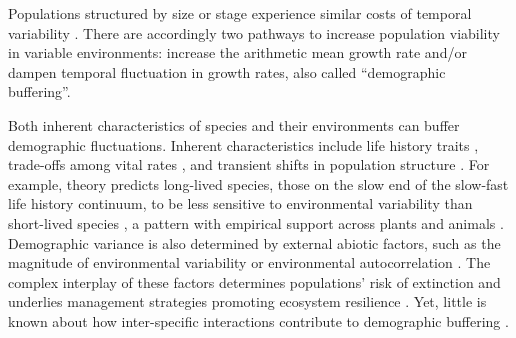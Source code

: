 \documentclass[lineno, sn-basic]{sn-jnl}%
\begin{document}
\noindent Populations structured by size or stage experience similar costs of temporal variability \citep{cohen1979comparative, tuljapurkar2013population}.
There are accordingly two pathways to increase population viability in variable environments: increase the arithmetic mean growth rate and/or dampen temporal fluctuation in growth rates, also called ``demographic buffering''.

Both inherent characteristics of species and their environments can buffer demographic fluctuations. 
Inherent characteristics include life history traits \citep{pfister1998patterns}, trade-offs among vital rates \citep{compagnoni2016effect}, and transient shifts in population structure \citep{ellis2013role}. 
For example, theory predicts long-lived species, those on the slow end of the slow-fast life history continuum, to be less sensitive to environmental variability than short-lived species \citep{murphy1968pattern}, a pattern with empirical support across plants \citep{davison2019stochastic,compagnoni2021herbaceous} and animals \citep{le2022life,morris2008longevity}.
Demographic variance is also determined by external abiotic factors, such as the magnitude of environmental variability \citep{rodriguez2021limits} or environmental autocorrelation \citep{tuljapurkar1980population,fieberg2001stochastic}.
The complex interplay of these factors determines populations' risk of extinction \citep{menges2000applications} and underlies management strategies promoting ecosystem resilience \citep{kuparinen2016fishing}. 
Yet, little is known about how inter-specific interactions contribute to demographic buffering \citep{hilde_demographic_2020}. 
\end{document}
